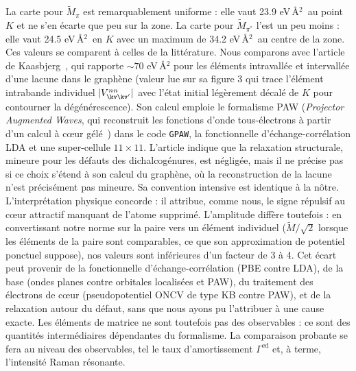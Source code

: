 La carte pour $\tilde M_\pi$ est remarquablement uniforme : elle vaut 23.9 eV\,\AA${^2}$~au point $K$ et ne s'en écarte que peu sur la zone. La carte pour $\tilde M_{\pi^*}$ l'est un peu moins : elle vaut 24.5 eV\,\AA$^{2}$~en $K$ avec un maximum de 34.2 eV\,\AA$^2$~au centre de la zone. Ces valeurs se comparent à celles de la littérature. Nous comparons avec l'article de Kaasbjerg~\cite{kaasbjergAtomisticMatrixTheory2020}, qui rapporte $\sim 70$ eV\,\AA$^2$ pour les éléments intravallée et intervallée d'une lacune dans le graphène (valeur lue sur sa figure 3 qui trace l'élément intrabande individuel $|V_{\kv\kv'}^{nn}|$ avec l'état initial légèrement décalé de $K$ pour contourner la dégénérescence). Son calcul emploie le formalisme PAW (\textit{Projector Augmented Waves}, qui reconstruit les fonctions d'onde tous-électrons à partir d'un calcul à c\oe ur gélé~\cite{blochlProjectorAugmentedwaveMethod1994}) dans le code \texttt{GPAW}, la fonctionnelle d'échange-corrélation LDA et une super-cellule $11\times 11$. L'article indique que la relaxation structurale, mineure pour les défauts des dichalcogénures, est négligée, mais il ne précise pas si ce choix s'étend à son calcul du graphène, où la reconstruction de la lacune n'est précisément pas mineure. Sa convention intensive est identique à la nôtre. L'interprétation physique concorde : il attribue, comme nous, le signe répulsif au c\oe ur attractif manquant de l'atome supprimé. L'amplitude diffère toutefois : en convertissant notre norme sur la paire vers un élément individuel ($\tilde M/\sqrt{2}$ lorsque les éléments de la paire sont comparables, ce que son approximation de potentiel ponctuel suppose), nos valeurs sont inférieures d'un facteur de 3 à 4. Cet écart peut provenir de la fonctionnelle d'échange-corrélation (PBE contre LDA), de la base (ondes planes contre orbitales localisées et PAW), du traitement des électrons de c\oe ur (pseudopotentiel ONCV de type KB contre PAW), et de la relaxation autour du défaut, sans que nous ayons pu l'attribuer à une cause exacte. Les éléments de matrice ne sont toutefois pas des observables : ce sont des quantités intermédiaires dépendantes du formalisme. La comparaison probante se fera au niveau des observables, tel le taux d'amortissement $\Gamma^\text{ed}$ et, à terme, l'intensité Raman résonante.


